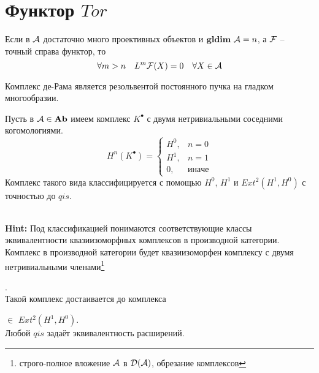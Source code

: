 \documentclass[../main.tex]{subfiles}
\begin{document}
\section{Функтор $Tor$}
\begin{to_note}
Если в $\mathcal{A}$ достаточно много проективных объектов и $\mathbf{gldim}\text{ } \mathcal{A} = n$, а $\mathcal{F}$ -- точный справа функтор, то 
\[\forall m > n\quad
L^m\mathcal{F}{(X)} = 0\quad
\forall X \in \mathcal{A}\]
\end{to_note}
\begin{to_note}
Комплекс де-Рама является резольвентой постоянного пучка на гладком многообразии.
\end{to_note}
\begin{to_claim}
Пусть в $\mathcal{A}\in \mathbf{Ab}$ имеем комплекс $K^\bullet$ с двумя нетривиальными соседними когомологиями.
\[
H^n(K^\bullet) = \begin{cases} H^0, &n = 0\\ H^1, &n = 1\\ 0, &иначе\end{cases}
\]
Комплекс такого вида классифицируется с помощью $H^0$, $H^1$ и $Ext^2(H^1, H^0)$ с точностью до $qis$.
\end{to_claim}\\
\textbf{Hint:} Под классификацией понимаются соответствующие классы эквивалентности квазиизоморфных комплексов в производной категории. Комплекс в производной категории будет квазиизоморфен комплексу с двумя нетривиальными членами\footnote{строго-полное вложение $\mathcal{A}$ в $\mathcal{D(A)}$, обрезание комплексов} . \\
Такой комплекс достаивается до комплекса  $\in$ $Ext^2(H^1, H^0)$. \\
Любой $qis$ задаёт эквивалентность расширений.
\bee
{}
\eee
\bee
{}
\end{document}
